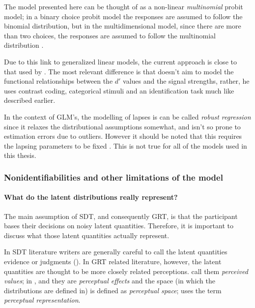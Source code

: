 \documentclass{article}\usepackage{knitr}
\begin{document}
The model presented here can be thought of as a non-linear \textit{multinomial} probit model; in a binary choice probit model the responses are assumed to follow the binomial distribution, but in the multidimensional model, since there are more than two choices, the responses are assumed to follow the multinomial distribution \cite[p. ERROR]{skrondahl2004}. 

Due to this link to generalized linear models, the current approach is close to that used by \cite{cohen2003}. The most relevant difference is that \citeauthor{cohen2003} doesn't aim to model the functional relationships between the $d'$ values and the signal strengths, rather, he uses contrast coding, categorical stimuli and an identification task much like described earlier.

In the context of GLM's, the modelling of lapses is can be called \textit{robust regression} \citep[p. 635]{kruschke2015} since it relaxes the distributional assumptions somewhat, and isn't so prone to estimation errors due to outliers. However it should be noted that this requires the lapsing parameters to be fixed \citep[p. ERROR]{skrondahl2004}. This is not true for all of the models used in this thesis.

\subsubsection{Nonidentifiabilities and other limitations of the model}

\paragraph{What do the latent distributions really represent?}

The main assumption of SDT, and consequently GRT, is that the participant bases their decisions on noisy latent quantities. Therefore, it is important to discuss what those latent quantities actually represent.  

In SDT literature writers are generally careful to call the latent quantities evidence \citep{wickens2002, verde2006} or judgments (\citealp[p. 247]{stigler2003}). In GRT related literature, however, the latent quantities are thought to be more closely related perceptions. \cite{ashby2015} call them \textit{perceived values}; in \cite{ashby1986},  \cite{kadlec1992} and \cite{silbert2009} they are \textit{perceptual effects} and the space (in which the distributions are defined in) is defined as \textit{perceptual space}; \cite{soto2017} uses the term \textit{perceptual representation}.
\end{document}
